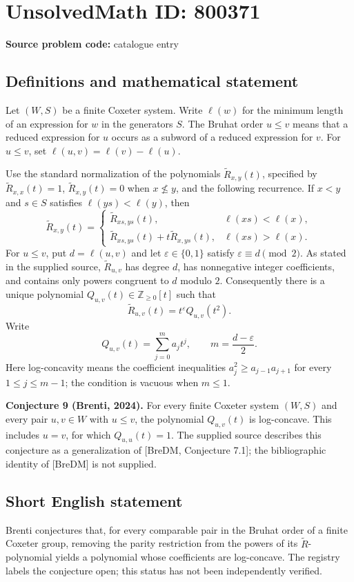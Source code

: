 \documentclass[11pt]{article}
\begin{document}
\section*{UnsolvedMath ID: 800371}
\textbf{Source problem code:} catalogue entry
\subsection{Definitions and mathematical statement}
Let \((W,S)\) be a finite Coxeter system. Write \(\ell(w)\) for the minimum length of an expression for \(w\) in the generators \(S\). The Bruhat order \(u\leq v\) means that a reduced expression for \(u\) occurs as a subword of a reduced expression for \(v\). For \(u\leq v\), set \(\ell(u,v)=\ell(v)-\ell(u)\).

Use the standard normalization of the polynomials \(\widetilde R_{x,y}(t)\), specified by \(\widetilde R_{x,x}(t)=1\), \(\widetilde R_{x,y}(t)=0\) when \(x\not\leq y\), and the following recurrence. If \(x<y\) and \(s\in S\) satisfies \(\ell(ys)<\ell(y)\), then
\[
\widetilde R_{x,y}(t)=
\begin{cases}
\widetilde R_{xs,ys}(t),&\ell(xs)<\ell(x),\\
\widetilde R_{xs,ys}(t)+t\widetilde R_{x,ys}(t),&\ell(xs)>\ell(x).
\end{cases}
\]
For \(u\leq v\), put \(d=\ell(u,v)\) and let \(\varepsilon\in\{0,1\}\) satisfy \(\varepsilon\equiv d\pmod 2\). As stated in the supplied source, \(\widetilde R_{u,v}\) has degree \(d\), has nonnegative integer coefficients, and contains only powers congruent to \(d\) modulo \(2\). Consequently there is a unique polynomial \(Q_{u,v}(t)\in\mathbb Z_{\geq0}[t]\) such that
\[
\widetilde R_{u,v}(t)=t^{\varepsilon}Q_{u,v}(t^2).
\]
Write
\[
Q_{u,v}(t)=\sum_{j=0}^{m}a_jt^j,
\qquad m=\frac{d-\varepsilon}{2}.
\]
Here log-concavity means the coefficient inequalities \(a_j^2\geq a_{j-1}a_{j+1}\) for every \(1\leq j\leq m-1\); the condition is vacuous when \(m\leq1\).

\textbf{Conjecture 9 (Brenti, 2024).} For every finite Coxeter system \((W,S)\) and every pair \(u,v\in W\) with \(u\leq v\), the polynomial \(Q_{u,v}(t)\) is log-concave. This includes \(u=v\), for which \(Q_{u,u}(t)=1\). The supplied source describes this conjecture as a generalization of [BreDM, Conjecture 7.1]; the bibliographic identity of [BreDM] is not supplied.
\subsection{Short English statement}
Brenti conjectures that, for every comparable pair in the Bruhat order of a finite Coxeter group, removing the parity restriction from the powers of its \(\widetilde R\)-polynomial yields a polynomial whose coefficients are log-concave. The registry labels the conjecture open; this status has not been independently verified.
\end{document}
